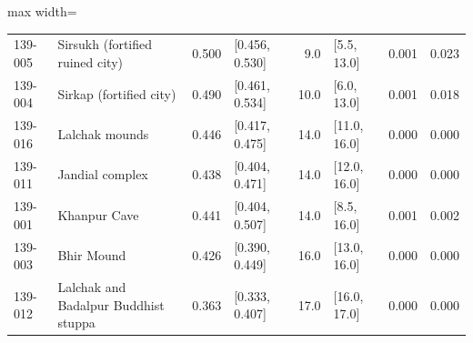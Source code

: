 \begin{landscape}
\begin{center}
\begin{adjustbox}{max width=\linewidth}
\begin{tabular}{p{}p{}rp{}rp{}rr}
139-005 & Sirsukh (fortified ruined city) & 0.500 & [0.456, 0.530] & 9.0 & [5.5, 13.0] & 0.001 & 0.023 \\
139-004 & Sirkap (fortified city) & 0.490 & [0.461, 0.534] & 10.0 & [6.0, 13.0] & 0.001 & 0.018 \\
139-016 & Lalchak mounds & 0.446 & [0.417, 0.475] & 14.0 & [11.0, 16.0] & 0.000 & 0.000 \\
139-011 & Jandial complex & 0.438 & [0.404, 0.471] & 14.0 & [12.0, 16.0] & 0.000 & 0.000 \\
139-001 & Khanpur Cave & 0.441 & [0.404, 0.507] & 14.0 & [8.5, 16.0] & 0.001 & 0.002 \\
139-003 & Bhir Mound & 0.426 & [0.390, 0.449] & 16.0 & [13.0, 16.0] & 0.000 & 0.000 \\
139-012 & Lalchak and Badalpur Buddhist stuppa & 0.363 & [0.333, 0.407] & 17.0 & [16.0, 17.0] & 0.000 & 0.000 \\
\bottomrule
\end{tabular}
\end{adjustbox}
\end{center}
\endgroup
\end{landscape}
